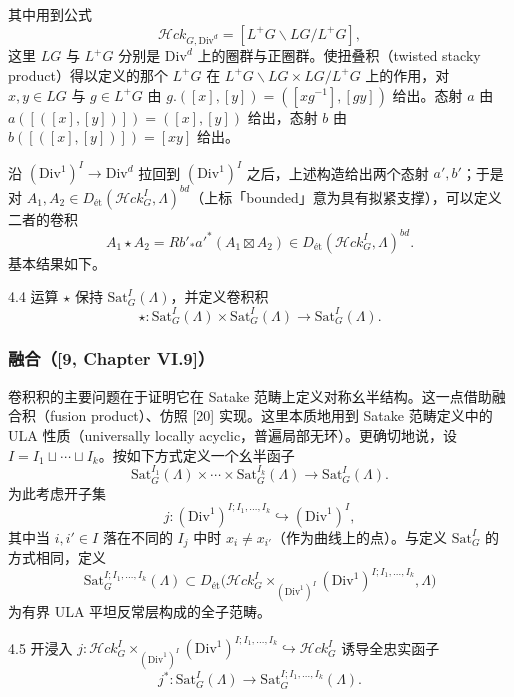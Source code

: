 其中用到公式
\[
\mathcal{H}ck_{G,\mathrm{Div}^{d}}=[L^{+}G\backslash LG/L^{+}G],
\]
这里 $LG$ 与 $L^{+}G$ 分别是 $\mathrm{Div}^{d}$ 上的圈群与正圈群。使扭叠积（twisted stacky product）得以定义的那个 $L^{+}G$ 在 $L^{+}G\backslash LG\times LG/L^{+}G$ 上的作用，对 $x,y\in LG$ 与 $g\in L^{+}G$ 由 $g.([x],[y])=([xg^{-1}],[gy])$ 给出。态射 $a$ 由 $a([([x],[y])])=([x],[y])$ 给出，态射 $b$ 由 $b([([x],[y])])=[xy]$ 给出。

沿 $(\mathrm{Div}^{1})^{I}\to\mathrm{Div}^{d}$ 拉回到 $(\mathrm{Div}^{1})^{I}$ 之后，上述构造给出两个态射 $a',b'$；于是对 $A_{1},A_{2}\in D_{\mathrm{ét}}(\mathcal{H}ck^{I}_{G},\Lambda)^{bd}$（上标「bounded」意为具有拟紧支撑），可以定义二者的卷积
\[
A_{1}\star A_{2}=Rb'_{*}a'^{*}(A_{1}\boxtimes A_{2})\in D_{\mathrm{ét}}(\mathcal{H}ck^{I}_{G},\Lambda)^{bd}.
\]
基本结果如下。

\begin{thm}{4.4}
运算 $\star$ 保持 $\mathrm{Sat}^{I}_{G}(\Lambda)$，并定义卷积积
\[
\star:\mathrm{Sat}^{I}_{G}(\Lambda)\times\mathrm{Sat}^{I}_{G}(\Lambda)\longrightarrow\mathrm{Sat}^{I}_{G}(\Lambda).
\]
\label{thm:a3-4-4}
\end{thm}

\subsubsection{融合（[9, Chapter VI.9]）}
卷积积的主要问题在于证明它在 Satake 范畴上定义对称幺半结构。这一点借助融合积（fusion product）、仿照 [20] 实现。这里本质地用到 Satake 范畴定义中的 ULA 性质（universally locally acyclic，普遍局部无环）。更确切地说，设 $I=I_{1}\sqcup\cdots\sqcup I_{k}$。按如下方式定义一个幺半函子
\[
\mathrm{Sat}^{I_{1}}_{G}(\Lambda)\times\cdots\times\mathrm{Sat}^{I_{k}}_{G}(\Lambda)\longrightarrow\mathrm{Sat}^{I}_{G}(\Lambda).
\]
为此考虑开子集
\[
j:(\mathrm{Div}^{1})^{I;I_{1},\dots,I_{k}}\hookrightarrow(\mathrm{Div}^{1})^{I},
\]
其中当 $i,i'\in I$ 落在不同的 $I_{j}$ 中时 $x_{i}\ne x_{i'}$（作为曲线上的点）。与定义 $\mathrm{Sat}^{I}_{G}$ 的方式相同，定义
\[
\mathrm{Sat}^{I;I_{1},\dots,I_{k}}_{G}(\Lambda)\subset D_{\mathrm{ét}}\bigl(\mathcal{H}ck^{I}_{G}\times_{(\mathrm{Div}^{1})^{I}}(\mathrm{Div}^{1})^{I;I_{1},\dots,I_{k}},\Lambda\bigr)
\]
为有界 ULA 平坦反常层构成的全子范畴。

\begin{thm}{4.5}
开浸入 $j:\mathcal{H}ck^{I}_{G}\times_{(\mathrm{Div}^{1})^{I}}(\mathrm{Div}^{1})^{I;I_{1},\dots,I_{k}}\hookrightarrow\mathcal{H}ck^{I}_{G}$ 诱导全忠实函子
\[
j^{*}:\mathrm{Sat}^{I}_{G}(\Lambda)\longrightarrow\mathrm{Sat}^{I;I_{1},\dots,I_{k}}_{G}(\Lambda).
\]
\label{thm:a3-4-5}
\end{thm}

